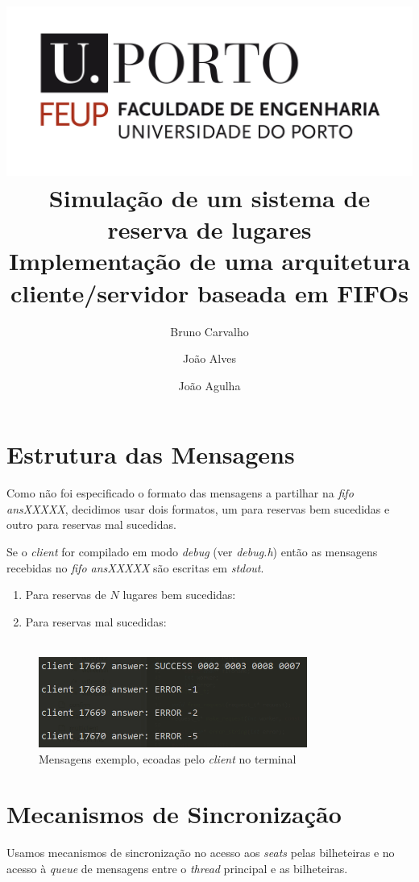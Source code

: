 \documentclass[11pt,a4paper,notitlepage]{article}
\title{
    \includegraphics[scale=0.15]{feuplogo.jpg}\\
    \vspace{0.5\baselineskip}
    \huge Simulação de um sistema de reserva de lugares\\
    \large Implementação de uma arquitetura cliente/servidor baseada em FIFOs\\
}
\author{
    Bruno Carvalho    \\\text{up201606517@fe.up.pt}
    \and
    João Alves        \\\text{up201605236@fe.up.pt}
    \and
    João Agulha       \\\text{up201607930@fe.up.pt}
}
\begin{document}
\maketitle
\tableofcontents
\pagebreak

\section{Estrutura das Mensagens}
\label{sec:structure}

Como não foi especificado o formato das mensagens a partilhar
na \emph{fifo ansXXXXX}, decidimos usar dois formatos, um para
reservas bem sucedidas e outro para reservas mal sucedidas.

Se o \emph{client} for compilado em modo \textit{debug} (ver
\emph{debug.h}) então as mensagens recebidas no \emph{fifo ansXXXXX}
são escritas em \emph{stdout}.\\

\begin{enumerate}
\item Para reservas de $N$ lugares bem sucedidas:\\
\item Para reservas mal sucedidas:\\
\\
\end{enumerate}

\begin{figure}[htbp]
\centering
\label{fig:ans}
\includegraphics[height=8em]{ans.png}
\caption{Mensagens exemplo, ecoadas pelo \emph{client} no terminal}
\end{figure}

\section{Mecanismos de Sincronização}
\label{sec:sync}

Usamos mecanismos de sincronização no acesso aos \emph{seats}
pelas bilheteiras e no acesso à \emph{queue} de mensagens entre
o \emph{thread} principal e as bilheteiras.
\end{document}
